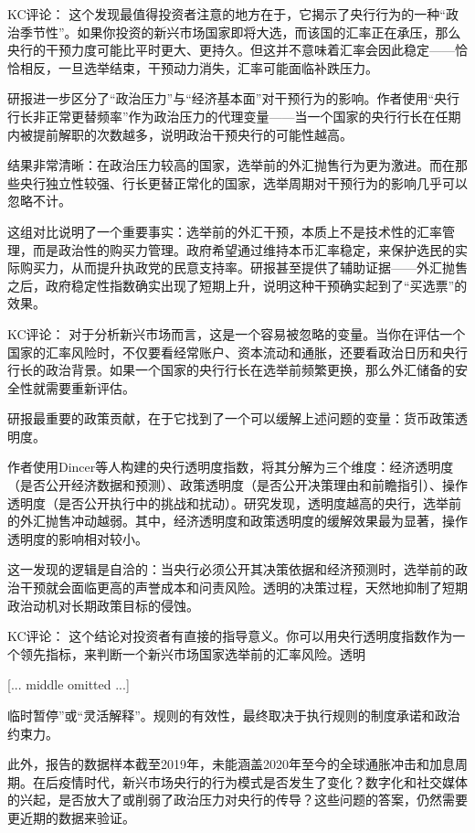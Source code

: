 \documentclass[11pt]{ctexart}
\begin{document}
KC评论： 这个发现最值得投资者注意的地方在于，它揭示了央行行为的一种“政治季节性”。如果你投资的新兴市场国家即将大选，而该国的汇率正在承压，那么央行的干预力度可能比平时更大、更持久。但这并不意味着汇率会因此稳定——恰恰相反，一旦选举结束，干预动力消失，汇率可能面临补跌压力。

研报进一步区分了“政治压力”与“经济基本面”对干预行为的影响。作者使用“央行行长非正常更替频率”作为政治压力的代理变量——当一个国家的央行行长在任期内被提前解职的次数越多，说明政治干预央行的可能性越高。

结果非常清晰：在政治压力较高的国家，选举前的外汇抛售行为更为激进。而在那些央行独立性较强、行长更替正常化的国家，选举周期对干预行为的影响几乎可以忽略不计。

这组对比说明了一个重要事实：选举前的外汇干预，本质上不是技术性的汇率管理，而是政治性的购买力管理。政府希望通过维持本币汇率稳定，来保护选民的实际购买力，从而提升执政党的民意支持率。研报甚至提供了辅助证据——外汇抛售之后，政府稳定性指数确实出现了短期上升，说明这种干预确实起到了“买选票”的效果。

KC评论： 对于分析新兴市场而言，这是一个容易被忽略的变量。当你在评估一个国家的汇率风险时，不仅要看经常账户、资本流动和通胀，还要看政治日历和央行行长的政治背景。如果一个国家的央行行长在选举前频繁更换，那么外汇储备的安全性就需要重新评估。

研报最重要的政策贡献，在于它找到了一个可以缓解上述问题的变量：货币政策透明度。

作者使用Dincer等人构建的央行透明度指数，将其分解为三个维度：经济透明度（是否公开经济数据和预测）、政策透明度（是否公开决策理由和前瞻指引）、操作透明度（是否公开执行中的挑战和扰动）。研究发现，透明度越高的央行，选举前的外汇抛售冲动越弱。其中，经济透明度和政策透明度的缓解效果最为显著，操作透明度的影响相对较小。

这一发现的逻辑是自洽的：当央行必须公开其决策依据和经济预测时，选举前的政治干预就会面临更高的声誉成本和问责风险。透明的决策过程，天然地抑制了短期政治动机对长期政策目标的侵蚀。

KC评论： 这个结论对投资者有直接的指导意义。你可以用央行透明度指数作为一个领先指标，来判断一个新兴市场国家选举前的汇率风险。透明

[... middle omitted ...]

临时暂停”或“灵活解释”。规则的有效性，最终取决于执行规则的制度承诺和政治约束力。

此外，报告的数据样本截至2019年，未能涵盖2020年至今的全球通胀冲击和加息周期。在后疫情时代，新兴市场央行的行为模式是否发生了变化？数字化和社交媒体的兴起，是否放大了或削弱了政治压力对央行的传导？这些问题的答案，仍然需要更近期的数据来验证。
\end{document}
